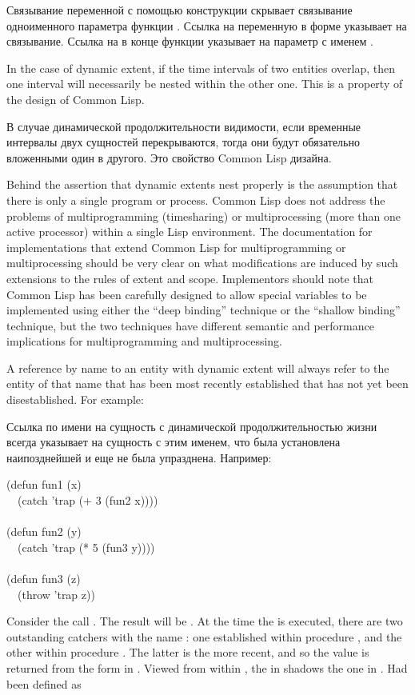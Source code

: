 Связывание переменной  с помощью конструкции  скрывает связывание
одноименного параметра функции . Ссылка на переменную  в форме
 указывает на  связывание. Ссылка на  в конце функции
указывает на параметр с именем .

In the case of dynamic extent, if the time intervals of two entities
overlap, then one interval will necessarily be nested within the
other one.  This is a property of the design of Common Lisp.

В случае динамической продолжительности видимости, если временные интервалы двух
сущностей перекрываются, тогда они будут обязательно вложенными один в другого. Это
свойство Common Lisp дизайна.

\beforenoterule
\begin{implementation}
Behind the assertion that dynamic extents nest properly
is the assumption that there is only a single program or process.
Common Lisp does not address the problems of multiprogramming
(timesharing) or
multiprocessing (more than one active processor)
within a single Lisp environment.  The documentation for
implementations that extend Common Lisp for multiprogramming or
multiprocessing should
be very clear on what modifications are induced by such extensions
to the rules of extent and scope.
Implementors should note that Common Lisp has been carefully designed
to allow special variables to be implemented using either
the ``deep binding'' technique or the ``shallow binding'' technique,
but the two techniques have different semantic
and performance implications for multiprogramming and multiprocessing.
\end{implementation}
\afternoterule

A reference by name to an entity with dynamic extent
will always refer to the entity of that name
that has been most recently established
that has not yet been disestablished.
For example:

Ссылка по имени на сущность с динамической продолжительностью жизни всегда
указывает на сущность с этим именем, что была установлена наипозднейшей и еще не
была упразднена.
Например:
\begin{lisp}
(defun fun1 (x) \\
~~(catch 'trap (+ 3 (fun2 x)))) \\
 \\
(defun fun2 (y) \\
~~(catch 'trap (* 5 (fun3 y)))) \\
 \\
(defun fun3 (z) \\
~~(throw 'trap z))
\end{lisp}
Consider the call .  The result will be .  At the time
the  is executed, there are two outstanding catchers with the
name : one established within procedure , and the other
within procedure .  The latter is the more recent, and so the
value  is returned from the  form in .
Viewed from within , the  in  shadows the one in .
Had 
been defined as

